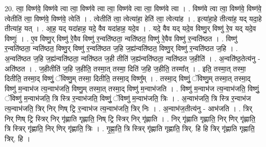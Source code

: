 \documentclass[17pt]{extarticle}
\begin{document}
20. त्वा॒ विष्ण॑वे॒ विष्ण॑वे त्वा त्वा॒ विष्ण॑वे त्वा त्वा॒ विष्ण॑वे त्वा त्वा॒ विष्ण॑वे त्वा । . विष्ण॑वे त्वा त्वा॒ विष्ण॑वे॒ विष्ण॑वे॒ त्वेतीति॑ त्वा॒ विष्ण॑वे॒ विष्ण॑वे॒ त्वेति॑ । . त्वेतीति॑ त्वा॒ त्वेत्या॑हा॒ हेति॑ त्वा॒ त्वेत्या॑ह । . इत्या॑हा॒हे तीत्या॑ह॒ यद् यदा॒हे तीत्या॑ह॒ यत् । . आ॒ह॒ यद् यदा॑हाह॒ यदे॒ वैव यदा॑हाह॒ यदे॒व । . यदे॒ वैव यद् यदे॒व विष्णु॒र् विष्णु॑ रे॒व यद् यदे॒व विष्णुः॑ । . ए॒व विष्णु॒र् विष्णु॑ रे॒वैव विष्णु॑ र॒न्वति॑ष्ठता॒ न्वति॑ष्ठत॒ विष्णु॑ रे॒वैव विष्णु॑ र॒न्वति॑ष्ठत । . विष्णु॑ र॒न्वति॑ष्ठता॒ न्वति॑ष्ठत॒ विष्णु॒र् विष्णु॑ र॒न्वति॑ष्ठत ज॒हि ज॒ह्य॑न्वति॑ष्ठत॒ विष्णु॒र् विष्णु॑ र॒न्वति॑ष्ठत ज॒हि । . अ॒न्वति॑ष्ठत ज॒हि ज॒ह्य॑न्वति॑ष्ठता॒ न्वति॑ष्ठत ज॒ही तीति॑ ज॒ह्य॑न्वति॑ष्ठता॒ न्वति॑ष्ठत ज॒हीति॑ । . अ॒न्वति॑ष्ठ॒तेत्य॑नु - अति॑ष्ठत । . ज॒हीतीति॑ ज॒हि ज॒हीति॒ तस्मा॒त् तस्मा॒ दिति॑ ज॒हि ज॒हीति॒ तस्मा᳚त् । . इति॒ तस्मा॒त् तस्मा॒ दितीति॒ तस्मा॒द् विष्णुं॒ ॅविष्णु॒म् तस्मा॒ दितीति॒ तस्मा॒द् विष्णु᳚म् । . तस्मा॒द् विष्णुं॒ ॅविष्णु॒म् तस्मा॒त् तस्मा॒द् विष्णु॑ म॒न्वाभ॑ज त्य॒न्वाभ॑जति॒ विष्णु॒म् तस्मा॒त् तस्मा॒द् विष्णु॑ म॒न्वाभ॑जति । . विष्णु॑ म॒न्वाभ॑ज त्य॒न्वाभ॑जति॒ विष्णुं॒ ॅविष्णु॑ म॒न्वाभ॑जति॒ त्रि स्त्रि र॒न्वाभ॑जति॒ विष्णुं॒ ॅविष्णु॑ म॒न्वाभ॑जति॒ त्रिः । . अ॒न्वाभ॑जति॒ त्रि स्त्रि र॒न्वाभ॑ज त्य॒न्वाभ॑जति॒ त्रिर् निर् णिष् ट्रि र॒न्वाभ॑ज त्य॒न्वाभ॑जति॒ त्रिर् निः । . अ॒न्वाभ॑ज॒तीत्य॑नु - आभ॑जति । . त्रिर् निर् णिष् ट्रि स्त्रिर् निर् गृ॑ह्णाति गृह्णाति॒ निष् ट्रि स्त्रिर् निर् गृ॑ह्णाति । . निर् गृ॑ह्णाति गृह्णाति॒ निर् णिर् गृ॑ह्णाति॒ त्रि स्त्रिर् गृ॑ह्णाति॒ निर् णिर् गृ॑ह्णाति॒ त्रिः । . गृ॒ह्णा॒ति॒ त्रि स्त्रिर् गृ॑ह्णाति गृह्णाति॒ त्रिर्. हि हि त्रिर् गृ॑ह्णाति गृह्णाति॒ त्रिर्. हि । \newline
\end{document}
